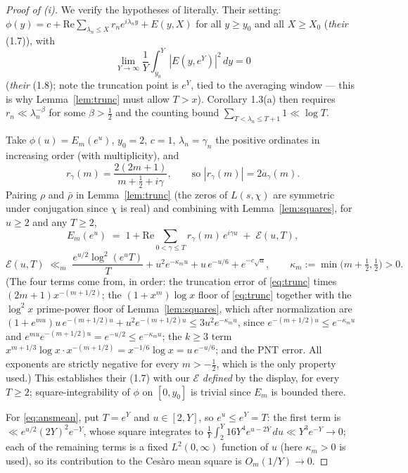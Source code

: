 \documentclass[11pt]{article}
\begin{document}
\begin{proof}[Proof of (i)]
We verify the hypotheses of \cite[Thm.~1.2 / Cor.~1.3(a)]{ANS14}
literally. Their setting: $\phi(y)=c+\mathrm{Re}\sum_{\lambda_n\le X}
r_ne^{i\lambda_ny}+E(y,X)$ for all $y\ge y_0$ and all $X\ge X_0$
(\emph{their} (1.7)), with
\begin{equation}\label{eq:ansmean}
\lim_{Y\to\infty}\frac1Y\int_{y_0}^{Y}|E(y,e^{Y})|^2\,dy=0
\end{equation}
(\emph{their} (1.8); note the truncation point is $e^Y$, tied to the
averaging window --- this is why Lemma~\ref{lem:trunc} must allow
$T>x$). Corollary 1.3(a) then requires $r_n\ll\lambda_n^{-\beta}$ for
some $\beta>\tfrac12$ and the counting bound
$\sum_{T<\lambda_n\le T+1}1\ll\log T$.

Take $\phi(u)=E_m(e^u)$, $y_0=2$, $c=1$, $\lambda_n=\gamma_n$ the
positive ordinates in increasing order (with multiplicity), and
\[
r_{\gamma}(m)=\frac{2(2m+1)}{m+\tfrac12+i\gamma},
\qquad\text{so } |r_\gamma(m)|=2a_\gamma(m).
\]
Pairing $\rho$ and $\bar\rho$ in Lemma~\ref{lem:trunc} (the zeros of
$L(s,\chi)$ are symmetric under conjugation since $\chi$ is real)
and combining with Lemma~\ref{lem:squares}, for $u\ge2$ and any
$T\ge2$,
\[
E_m(e^u)\;=\;1+\mathrm{Re}\!\!\sum_{0<\gamma\le T}\!\! r_\gamma(m)\,
e^{i\gamma u}\;+\;\mathcal E(u,T),
\]
\[
\mathcal E(u,T)\;\ll_m\;
\frac{e^{u/2}\log^2(e^uT)}{T}
+u^2e^{-\kappa_m u}
+u\,e^{-u/6}
+e^{-c\sqrt{u}},
\qquad
\kappa_m:=\min\bigl(m+\tfrac12,\tfrac12\bigr)>0 .
\]
(The four terms come from, in order: the truncation error of
\eqref{eq:trunc} times $(2m+1)x^{-(m+1/2)}$; the $(1+x^m)\log x$ floor
of \eqref{eq:trunc} together with the $\log^2x$ prime-power floor of
Lemma~\ref{lem:squares}, which after normalization are
$(1+e^{mu})u\,e^{-(m+1/2)u}+u^2e^{-(m+1/2)u}\le3u^2e^{-\kappa_mu}$,
since $e^{-(m+1/2)u}\le e^{-\kappa_mu}$ and
$e^{mu}e^{-(m+1/2)u}=e^{-u/2}\le e^{-\kappa_mu}$; the $k\ge3$ term
$x^{m+1/3}\log x\cdot x^{-(m+1/2)}=x^{-1/6}\log x=u\,e^{-u/6}$; and
the PNT error. All exponents are strictly negative for every
$m>-\tfrac12$, which is the only property used.) This establishes their
(1.7) with our $\mathcal E$ \emph{defined} by the display, for every
$T\ge2$; square-integrability of $\phi$ on $[0,y_0]$ is trivial since
$E_m$ is bounded there.

For \eqref{eq:ansmean}, put $T=e^{Y}$ and $u\in[2,Y]$, so
$e^u\le e^Y=T$: the first term is
$\ll e^{u/2}(2Y)^2e^{-Y}$, whose square integrates to
$\frac1Y\int_2^Y 16Y^4e^{u-2Y}\,du\ll Y^3e^{-Y}\to0$; each of the
remaining terms is a fixed $L^2(0,\infty)$ function of $u$ (here
$\kappa_m>0$ is used), so its contribution to the Ces\`aro mean square
is $O_m(1/Y)\to0$.


\end{proof}
\end{document}
